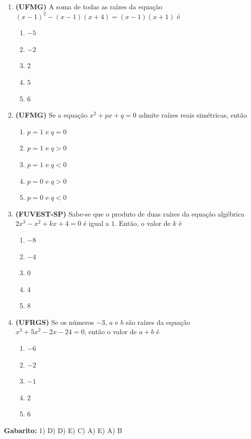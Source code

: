 \documentclass[12pt,a4paper]{article}
\begin{document}
\begin{enumerate}
    \vspace{0.3cm}

    \item \textbf{(UFMG)} A soma de todas as raízes da equação $(x - 1)^2 - (x - 1)(x + 4) = (x - 1)(x + 1)$ é
    \begin{enumerate}
        \item $-5$
        \item $-2$
        \item $2$
        \item $5$
        \item $6$
    \end{enumerate}

    \vspace{0.3cm}

    \item \textbf{(UFMG)} Se a equação $x^2 + px + q = 0$ admite raízes reais simétricas, então
    \begin{enumerate}
        \item $p = 1$ e $q = 0$
        \item $p = 1$ e $q > 0$
        \item $p = 1$ e $q < 0$
        \item $p = 0$ e $q > 0$
        \item $p = 0$ e $q < 0$
    \end{enumerate}

    \vspace{0.3cm}

    \item \textbf{(FUVEST-SP)} Sabe-se que o produto de duas raízes da equação algébrica $2x^3 - x^2 + kx + 4 = 0$ é igual a $1$. Então, o valor de $k$ é
    \begin{enumerate}
        \item $-8$
        \item $-4$
        \item $0$
        \item $4$
        \item $8$
    \end{enumerate}

    \vspace{0.3cm}

    \item \textbf{(UFRGS)} Se os números $-3$, $a$ e $b$ são raízes da equação $x^3 + 5x^2 - 2x - 24 = 0$, então o valor de $a + b$ é
    \begin{enumerate}
        \item $-6$
        \item $-2$
        \item $-1$
        \item $2$
        \item $6$
    \end{enumerate}
\end{enumerate}

\textbf{Gabarito:} 1) D) D) E) C) A) E) A) B\quad 
\end{document}
